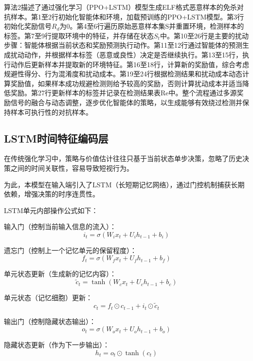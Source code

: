 算法2描述了通过强化学习（PPO+LSTM）模型生成ELF格式恶意样本的免杀对抗样本。第1至2行初始化智能体和环境，加载预训练的PPO+LSTM模型。第3行初始化奖励信号$R_d$为0。第4至6行遍历原始恶意样本集S并重置环境，检测样本的标签。第7至9行提取环境中的特征，并存储在状态$S_t$中。第10至26行是主要的扰动步骤：智能体根据当前状态和奖励预测执行动作。第11至12行通过智能体的预测生成扰动动作，并根据样本标签（恶意或良性）决定是否继续执行。第13至15行，执行动作后更新样本并提取新的环境特征。第16至18行，计算新的奖励值，综合考虑规避性得分、行为混淆度和扰动成本。第19至24行根据检测结果和扰动成本动态计算奖励值，如果样本成功规避检测则给予较高的奖励，否则计算扰动成本并适当降低奖励。第27行更新样本的标签并记录在检测结果表Re中。整个流程通过多源奖励信号的融合与动态调整，逐步优化智能体的策略，以生成能够有效绕过检测并保持样本可执行性的对抗样本。

\subsection{LSTM时间特征编码层}

在传统强化学习中，策略与价值估计往往只基于当前状态单步决策，忽略了历史决策之间的时间关联性，容易导致短视行为。

为此，本模型在输入端引入了LSTM（长短期记忆网络），通过门控机制捕获长期依赖，增强决策的时序连贯性。

LSTM单元内部操作公式如下：

输入门（控制当前输入信息的流入）：
\begin{equation}
i_t = \sigma(W_i x_t + U_i h_{t-1} + b_i)
\end{equation}

遗忘门（控制上一个记忆单元的保留程度）：
\begin{equation}
f_t = \sigma(W_f x_t + U_f h_{t-1} + b_f)
\end{equation}

单元状态更新（生成新的记忆内容）：
\begin{equation}
\tilde{c}_t = \tanh(W_c x_t + U_c h_{t-1} + b_c)
\end{equation}

单元状态（记忆细胞）更新：
\begin{equation}
c_t = f_t \odot c_{t-1} + i_t \odot \tilde{c}_t
\end{equation}

输出门（控制隐藏状态输出）：
\begin{equation}
o_t = \sigma(W_o x_t + U_o h_{t-1} + b_o)
\end{equation}

隐藏状态更新（作为下一步输出）：
\begin{equation}
h_t = o_t \odot \tanh(c_t)
\end{equation}

